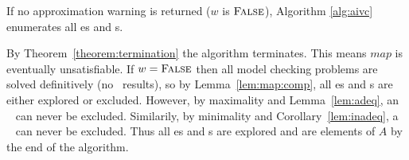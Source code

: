 \begin{theorem}
\label{theorem:aivc}
  If no approximation warning is returned ($w$ is $\textsc{False}$), Algorithm \ref{alg:aivc} enumerates all \mis es and \mivc s.
\end{theorem}

\begin{IEEEproof}
By Theorem~\ref{theorem:termination} the algorithm terminates. This
means $map$ is eventually unsatisfiable.  If $w = \textsc{False}$ then all model checking problems are solved definitively (no \unknown\ results), so by Lemma~\ref{lem:map:comp},
all \mis es and \mivc s are either explored or excluded.
However, by maximality and Lemma~\ref{lem:adeq}, an \mis~ can never be
excluded. Similarily, by minimality and Corollary~\ref{lem:inadeq}, a
\mivc~ can never be excluded. Thus all \mis es and \mivc s are
explored and are elements of $A$ by the end of the algorithm.









%



\end{IEEEproof}
